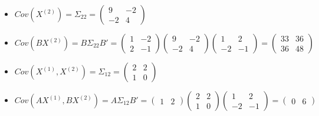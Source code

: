 \documentclass{article}
\begin{document}
\begin{itemize}
    \item[(g)] $Cov(X^{(2)}) = \Sigma_{22} = \begin{pmatrix}9&-2\\ -2&4\end{pmatrix}$
    \item[(h)] $Cov(BX^{(2)}) = B \Sigma_{22} B' = \begin{pmatrix}1&-2\\ 2&-1\end{pmatrix}\begin{pmatrix}9&-2\\ -2&4\end{pmatrix}\begin{pmatrix}1&2\\ -2&-1\end{pmatrix} = \begin{pmatrix}33&36\\ 36&48\end{pmatrix}$
    \item[(i)] $Cov(X^{(1)}, X^{(2)}) = \Sigma_{12} = \begin{pmatrix}2&2\\ 1&0\end{pmatrix}$
    \item[(j)] $Cov(AX^{(1)}, BX^{(2)}) = A \Sigma_{12} B' = \begin{pmatrix}1&2\end{pmatrix}\begin{pmatrix}2&2\\ 1&0\end{pmatrix}\begin{pmatrix}1&2\\ -2&-1\end{pmatrix} = \begin{pmatrix}0&6\end{pmatrix}$
\end{itemize}
\end{document}
